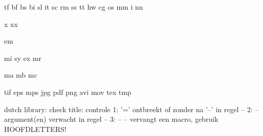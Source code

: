 
 {tf}
 {bf}
 {bs}
 {bi}
 {sl}
 {it}
 {sc}
 {rm}
 {ss}
 {tt}
 {hw}
 {cg}
 {os}
 {mm}
  {i}
 {nn}

  {x}
 {xx}

 {em}

 {mi}
 {sy}
 {ex}
 {mr}

 {ma}
 {mb}
 {mc}


  {tif}
  {eps}
  {mps}
  {jpg}
  {pdf}
  {png}
  {avi}
  {mov}
  {tex}
  {tmp}


\selectinterface


\ifinterfacetranslation \else

\startmessages  dutch  library: check
  title: controle
      1: '=' ontbreekt of zonder {} na '--' in regel --
      2: -- argument(en) verwacht in regel --
      3: -- -- vervangt een macro, gebruik HOOFDLETTERS!
\stopmessages


